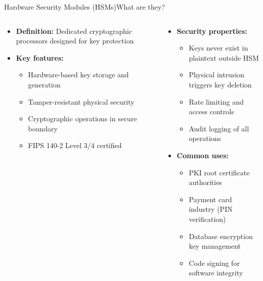 \documentclass[aspectratio=169, lualatex, handout]{beamer}
\begin{document}
\begin{frame}{Hardware Security Modules (HSMs)}{What are they?}
	\begin{columns}[c]
		\begin{column}{0.4\textwidth}
			\begin{itemize}
				\item \textbf{Definition:} Dedicated cryptographic processors designed for key protection
				\item \textbf{Key features:}
				      \begin{itemize}
					      \item Hardware-based key storage and generation
					      \item Tamper-resistant physical security
					      \item Cryptographic operations in secure boundary
					      \item FIPS 140-2 Level 3/4 certified
				      \end{itemize}
			\end{itemize}
		\end{column}
		\begin{column}{0.6\textwidth}
			\begin{itemize}
				\item \textbf{Security properties:}
				      \begin{itemize}
					      \item Keys never exist in plaintext outside HSM
					      \item Physical intrusion triggers key deletion
					      \item Rate limiting and access controls
					      \item Audit logging of all operations
				      \end{itemize}
				\item \textbf{Common uses:}
				      \begin{itemize}
					      \item PKI root certificate authorities
					      \item Payment card industry (PIN verification)
					      \item Database encryption key management
					      \item Code signing for software integrity
				      \end{itemize}
			\end{itemize}
		\end{column}
	\end{columns}
\end{frame}
\end{document}
